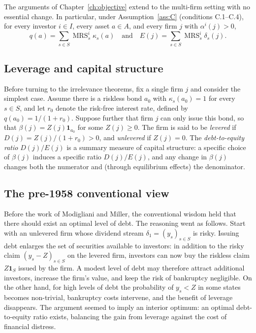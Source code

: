 \documentclass[11pt,a4paper,oneside]{book}
\def\1{\mathbf{1}}
\def\geq{\geqslant}
\def\et{\quad \text{and} \quad}
\DeclareMathOperator{\MRS}{MRS}
\theoremstyle{plain}
\theoremstyle{definition}
\theoremstyle{remark}
\numberwithin{equation}{chapter}
\begin{document}
The arguments of Chapter~\ref{ch:objective} extend to the multi-firm setting with no essential change.
In particular, under Assumption~\ref{ass:C} (conditions C.1--C.4), for every investor $i \in I$, every asset $a \in A$, and every firm $j$ with $\alpha^i(j) > 0$,
\begin{equation}\label{eq:price-multi}
  q(a) = \sum_{s \in S} \MRS^i_s \kappa_s(a)
  \et
  E(j) = \sum_{s \in S} \MRS^i_s \delta_s(j).
\end{equation}

\subsection{Leverage and capital structure}

Before turning to the irrelevance theorems, fix a single firm $j$ and consider the simplest case.
Assume there is a riskless bond $a_0$ with $\kappa_s(a_0) = 1$ for every $s \in S$, and let $r_0$ denote the risk-free interest rate, defined by $q(a_0) = 1/(1+r_0)$.
Suppose further that firm $j$ can only issue this bond, so that $\beta(j) = Z(j) \1_{a_0}$ for some $Z(j) \geq 0$.
The firm is said to be \emph{levered} if $D(j) = Z(j)/(1+r_0) > 0$, and \emph{unlevered} if $Z(j) = 0$.
The \emph{debt-to-equity ratio} $D(j)/E(j)$ is a summary measure of capital structure: a specific choice of $\beta(j)$ induces a specific ratio $D(j)/E(j)$, and any change in $\beta(j)$ changes both the numerator and (through equilibrium effects) the denominator.

\subsection{The pre-1958 conventional view}

Before the work of Modigliani and Miller, the conventional wisdom held that there should exist an optimal level of debt.
The reasoning went as follows.
Start with an unlevered firm whose dividend stream $\delta_1 = (y_s)_{s \in S}$ is risky.
Issuing debt enlarges the set of securities available to investors: in addition to the risky claim $(y_s - Z)_{s \in S}$ on the levered firm, investors can now buy the riskless claim $Z \1_S$ issued by the firm.
A modest level of debt may therefore attract additional investors, increase the firm's value, and keep the risk of bankruptcy negligible.
On the other hand, for high levels of debt the probability of $y_s < Z$ in some states becomes non-trivial, bankruptcy costs intervene, and the benefit of leverage disappears.
The argument seemed to imply an interior optimum: an optimal debt-to-equity ratio exists, balancing the gain from leverage against the cost of financial distress.
\end{document}
